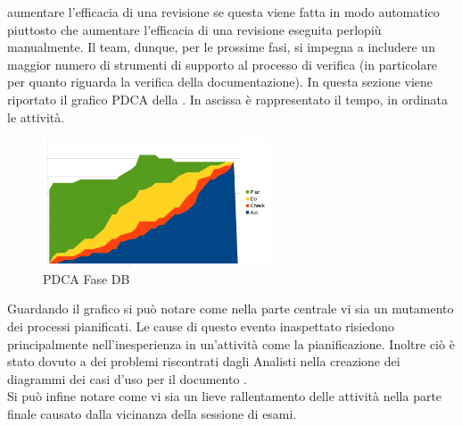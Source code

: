 				aumentare l'efficacia di una revisione se questa viene fatta in modo automatico piuttosto che aumentare l'efficacia di una revisione 
				eseguita perlopiù manualmente. Il team, dunque, per le prossime fasi, si impegna a includere un maggior numero di strumenti di supporto 
				al processo di verifica (in particolare per quanto riguarda la verifica della documentazione).
			In questa sezione viene riportato il grafico PDCA della . In ascissa è rappresentato il tempo, in ordinata le attività.
			\begin{figure}[H]
				\centering
				\includegraphics[width=0.6\textwidth]{PianoDiQualifica/Pics/GraficoPDCAFaseDB.pdf}
				\caption{PDCA Fase DB}
			\end{figure}
			Guardando il grafico si può notare come nella parte centrale vi sia un mutamento dei processi pianificati. Le cause di questo evento 
			inaspettato	risiedono principalmente nell'inesperienza in un'attività come la pianificazione. Inoltre ciò è stato dovuto a dei problemi 
			riscontrati dagli Analisti nella creazione dei diagrammi dei casi d'uso per il documento .\\
			Si può infine notare come vi sia un lieve rallentamento delle attività nella parte finale causato dalla vicinanza della sessione di esami.
